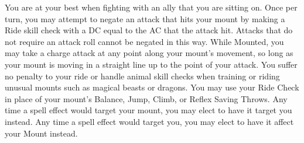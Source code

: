 {You are at your best when fighting with an ally that you are sitting on.}
{Once per turn, you may attempt to negate an attack that hits your mount by making a Ride skill check with a DC equal to the AC that the attack hit. Attacks that do not require an attack roll cannot be negated in this way.}
{While Mounted, you may take a charge attack at any point along your mount's movement, so long as your mount is moving in a straight line up to the point of your attack.}
{You suffer no penalty to your ride or handle animal skill checks when training or riding unusual mounts such as magical beasts or dragons.}
{You may use your Ride Check in place of your mount's Balance, Jump, Climb, or Reflex Saving Throws.}
{Any time a spell effect would target your mount, you may elect to have it target you instead. Any time a spell effect would target you, you may elect to have it affect your Mount instead.}